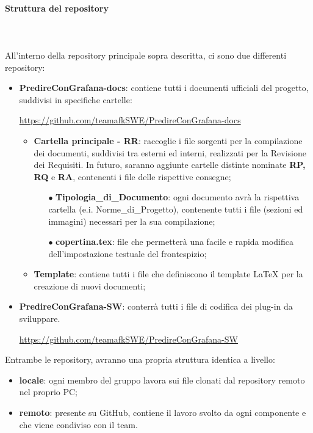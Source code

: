 \paragraph{Struttura del repository} \mbox{} \\ \mbox{} \\
All'interno della repository principale sopra descritta, ci sono due differenti repository: \begin{itemize}
\item \textbf{PredireConGrafana-docs}: contiene tutti i documenti ufficiali del progetto, suddivisi in specifiche cartelle: \\
\centerline{\url{https://github.com/teamafkSWE/PredireConGrafana-docs}}  \begin{itemize}
\item \textbf{Cartella principale - RR}: raccoglie i file sorgenti per la compilazione dei documenti, suddivisi tra esterni ed interni, realizzati per la Revisione dei Requisiti. In futuro, saranno aggiunte cartelle distinte nominate \textbf{RP, RQ} e \textbf{RA}, contenenti i file delle rispettive consegne;
\begin{itemize}
\item[$\bullet$] \textbf{Tipologia\_di\_Documento}: ogni documento avrà la rispettiva cartella (e.i. Norme\_di\_Progetto), contenente tutti i file (sezioni ed immagini) necessari per la sua compilazione;
\item[$\bullet$] \textbf{copertina.tex}: file che permetterà una facile e rapida modifica dell'impostazione testuale del frontespizio;
\end{itemize}
\item \textbf{Template}: contiene tutti i file che definiscono il template \LaTeX{} per la creazione di nuovi documenti;
\end{itemize} 
\item \textbf{PredireConGrafana-SW}: conterrà tutti i file di codifica dei plug-in da sviluppare. \\ \centerline{\url{https://github.com/teamafkSWE/PredireConGrafana-SW}}
\end{itemize}
Entrambe le repository, avranno una propria struttura identica a livello: \begin{itemize}
\item \textbf{locale}: ogni membro del gruppo lavora sui file clonati dal repository remoto nel proprio PC;
\item \textbf{remoto}: presente su GitHub, contiene il lavoro svolto da ogni componente e che viene condiviso con il team.
\end{itemize}


